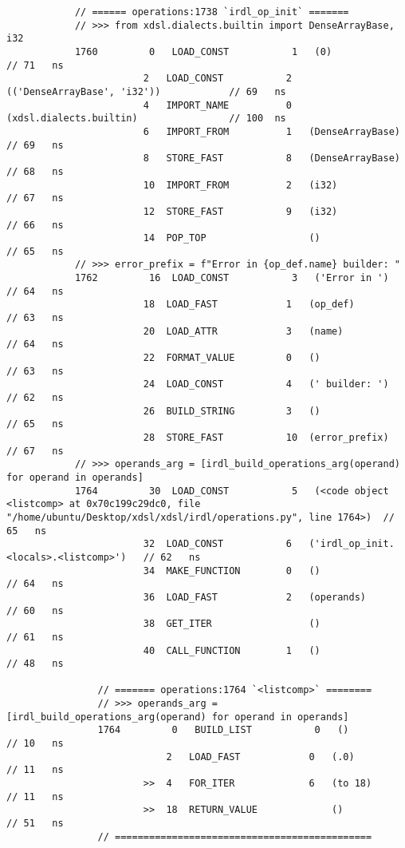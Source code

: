 \begin{code}
\begin{verbatim}
            // ====== operations:1738 `irdl_op_init` =======
            // >>> from xdsl.dialects.builtin import DenseArrayBase, i32
            1760         0   LOAD_CONST           1   (0)                                   // 71   ns
                        2   LOAD_CONST           2   (('DenseArrayBase', 'i32'))            // 69   ns
                        4   IMPORT_NAME          0   (xdsl.dialects.builtin)                // 100  ns
                        6   IMPORT_FROM          1   (DenseArrayBase)                       // 69   ns
                        8   STORE_FAST           8   (DenseArrayBase)                       // 68   ns
                        10  IMPORT_FROM          2   (i32)                                  // 67   ns
                        12  STORE_FAST           9   (i32)                                  // 66   ns
                        14  POP_TOP                  ()                                     // 65   ns
            // >>> error_prefix = f"Error in {op_def.name} builder: "
            1762         16  LOAD_CONST           3   ('Error in ')                         // 64   ns
                        18  LOAD_FAST            1   (op_def)                               // 63   ns
                        20  LOAD_ATTR            3   (name)                                 // 64   ns
                        22  FORMAT_VALUE         0   ()                                     // 63   ns
                        24  LOAD_CONST           4   (' builder: ')                         // 62   ns
                        26  BUILD_STRING         3   ()                                     // 65   ns
                        28  STORE_FAST           10  (error_prefix)                         // 67   ns
            // >>> operands_arg = [irdl_build_operations_arg(operand) for operand in operands]
            1764         30  LOAD_CONST           5   (<code object <listcomp> at 0x70c199c29dc0, file "/home/ubuntu/Desktop/xdsl/xdsl/irdl/operations.py", line 1764>)  // 65   ns
                        32  LOAD_CONST           6   ('irdl_op_init.<locals>.<listcomp>')   // 62   ns
                        34  MAKE_FUNCTION        0   ()                                     // 64   ns
                        36  LOAD_FAST            2   (operands)                             // 60   ns
                        38  GET_ITER                 ()                                     // 61   ns
                        40  CALL_FUNCTION        1   ()                                     // 48   ns

                // ======= operations:1764 `<listcomp>` ========
                // >>> operands_arg = [irdl_build_operations_arg(operand) for operand in operands]
                1764         0   BUILD_LIST           0   ()                                // 10   ns
                            2   LOAD_FAST            0   (.0)                               // 11   ns
                        >>  4   FOR_ITER             6   (to 18)                            // 11   ns
                        >>  18  RETURN_VALUE             ()                                 // 51   ns
                // =============================================


\end{verbatim}
\end{code}
